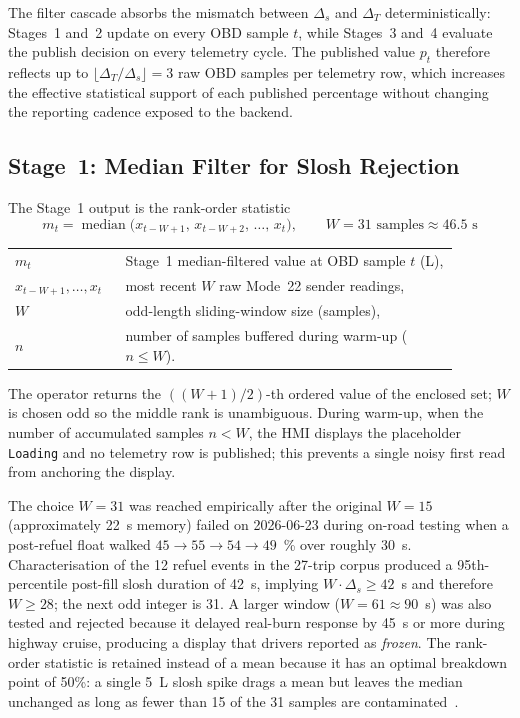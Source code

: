 \noindent
The filter cascade absorbs the mismatch between $\Delta_s$ and $\Delta_T$ deterministically: Stages~1 and~2 update on every OBD sample $t$, while Stages~3 and~4 evaluate the publish decision on every telemetry cycle. The published value $p_t$ therefore reflects up to $\lfloor \Delta_T / \Delta_s \rfloor = 3$ raw OBD samples per telemetry row, which increases the effective statistical support of each published percentage without changing the reporting cadence exposed to the backend.

\subsection{Stage~1: Median Filter for Slosh Rejection}
\label{sec:fuel_median}

The Stage~1 output is the rank-order statistic
\begin{equation}
m_t = \operatorname{median}\bigl( x_{t-W+1},\, x_{t-W+2},\, \ldots,\, x_t \bigr), \qquad W = 31 \text{ samples} \approx 46.5\text{ s}
\label{eq:median_filter}
\end{equation}
\noindent\begin{tabular}{@{}p{0.20\linewidth}@{\quad}p{0.68\linewidth}@{}}
$m_t$ & Stage~1 median-filtered value at OBD sample $t$ (L), \\
$x_{t-W+1}, \ldots, x_t$ & most recent $W$ raw Mode~22 sender readings, \\
$W$ & odd-length sliding-window size (samples), \\
$n$ & number of samples buffered during warm-up ($n \leq W$).
\end{tabular}

\vspace{0.5em}
The operator returns the $((W+1)/2)$-th ordered value of the enclosed set; $W$ is chosen odd so the middle rank is unambiguous. During warm-up, when the number of accumulated samples $n < W$, the HMI displays the placeholder \texttt{Loading} and no telemetry row is published; this prevents a single noisy first read from anchoring the display.

The choice $W = 31$ was reached empirically after the original $W = 15$ (approximately 22~s memory) failed on 2026-06-23 during on-road testing when a post-refuel float walked $45 \to 55 \to 54 \to 49$~\% over roughly 30~s. Characterisation of the 12 refuel events in the 27-trip corpus produced a 95th-percentile post-fill slosh duration of 42~s, implying $W \cdot \Delta_s \geq 42$~s and therefore $W \geq 28$; the next odd integer is 31. A larger window ($W = 61 \approx 90$~s) was also tested and rejected because it delayed real-burn response by 45~s or more during highway cruise, producing a display that drivers reported as \emph{frozen}. The rank-order statistic is retained instead of a mean because it has an optimal breakdown point of 50\%: a single 5~L slosh spike drags a mean but leaves the median unchanged as long as fewer than 15 of the 31 samples are contaminated~\cite{rousseeuw1993mad}.

